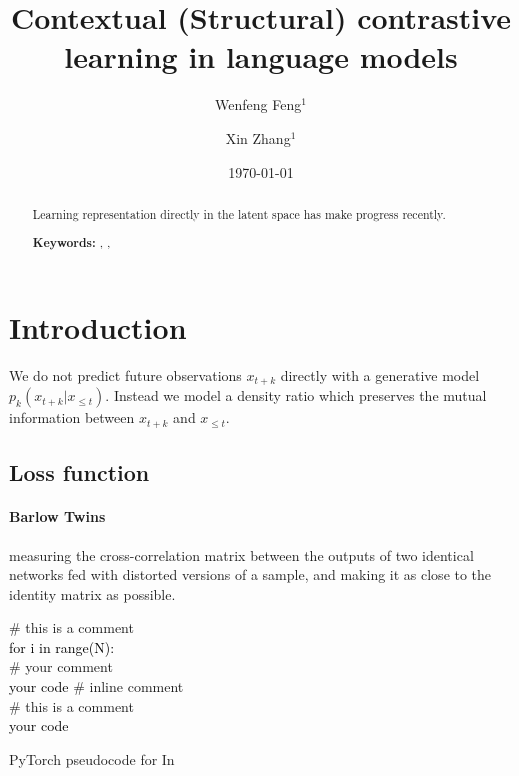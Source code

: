 \documentclass[a4paper]{article}
\title{
	Contextual (Structural) contrastive learning in language models
	}
\author{Wenfeng Feng$^1$ \and Xin Zhang$^1$}
\date{
	\today
}
\newcommand{\PyComment}[1]{\ttfamily\textcolor{green!50!black}{\# #1}}  %
\newcommand{\PyCode}[1]{\ttfamily\textcolor{black}{#1}} %
\begin{document}
	\maketitle
	
	\begin{abstract}
		Learning representation directly in the latent space has make progress recently.
		
		\noindent\textbf{Keywords:} , , 
	\end{abstract}

	\tableofcontents
	
	\section{Introduction}
	\label{sec:intro}
	
	We do not predict future observations $x_{t+k}$ directly with a generative model $p_k(x_{t+k}|x_{\le t})$.
	Instead we model a density ratio which preserves the mutual information between $x_{t+k}$ and $x_{\le t}$.
	\cite{van2018representation}
	
	\subsection{Loss function}
	\label{subsec:loss}

	\paragraph*{Barlow Twins} \cite{zbontar2021barlow}
	measuring the cross-correlation matrix between the outputs of two identical networks fed with distorted versions of a sample,
	and making it as close to the identity matrix as possible.

	\begin{algorithm}[h]
		\SetInd{1em}{1em}
			\PyComment{this is a comment} \\
			\PyCode{for i in range(N):} \\
			\Indp   %
				\PyComment{your comment} \\
				\PyCode{your code} \PyComment{inline comment} \\ 
			\Indm %
			\PyComment{this is a comment} \\
			\PyCode{your code}
		\caption{PyTorch pseudocode for In}
		\label{algo:your-algo}
	\end{algorithm}
		
\end{document}
